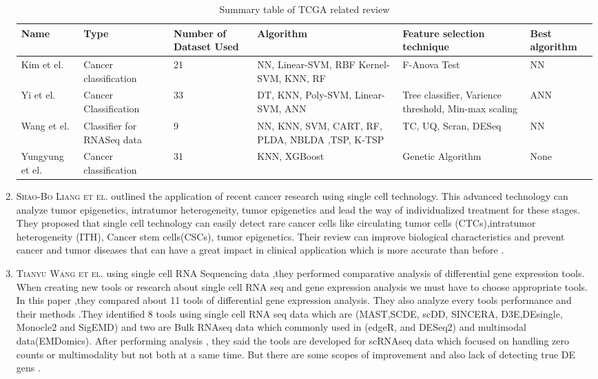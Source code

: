 \begin{enumerate}
   \begin{table}[H]
    \centering
    \begin{tabular}{|| p{2.1cm} |p{2.1cm} |p{2.1cm} |p{1.5cm}|p{2.1cm} | p{2.1cm}||}
    \hline\hline
     Name & Type & Number of Dataset Used & Algorithm & Feature selection technique & Best algorithm \\
     \hline
     Kim et el. \cite{10.1093/bioinformatics/btz772} & Cancer classification & 21 & NN, Linear-SVM, RBF Kernel- SVM, KNN, RF & F-Anova Test & NN  \\
      \hline
      Yi et el. \cite{pmid30441551} & Cancer Classification & 33 & DT,  KNN,  Poly-SVM, Linear-SVM, ANN &Tree classifier, Varience threshold, Min-max scaling & ANN  \\ 
     \hline
     Wang et el. \cite{10.1093/bioinformatics/btz801} & Classifier for RNASeq data
 & 9 & NN, KNN, SVM, CART, RF, PLDA, NBLDA ,TSP, K-TSP & TC, UQ, Scran, DESeq & NN \\
     \hline
    
     
     Yungyung et el. \cite{pmid28673244} & Cancer classification & 31 & KNN, XGBoost & Genetic Algorithm & None \\
     \hline
    
     
     
    \end{tabular}
    \caption{Summary table of TCGA related review}
    \label{table:1}
    \end{table}


  \item \textsc{Shao-Bo Liang et el.} outlined the application of recent cancer research using single cell technology.  This advanced technology can analyze tumor epigenetics, intratumor heterogeneity, tumor epigenetics and lead the way of individualized treatment for these stages. They proposed that single cell technology can easily detect rare cancer cells like circulating tumor cells (CTCs),intratumor heterogeneity (ITH), Cancer stem cells(CSCs), tumor epigenetics. Their review can improve biological characteristics and prevent  cancer and tumor diseases that can have a great impact in clinical application which is more accurate than before \cite{pmid10.1016}.
  
  \item \textsc{Tianyu Wang et el.} using single cell RNA Sequencing data ,they performed comparative analysis of differential gene expression tools. When creating new tools or research about single cell RNA seq and gene expression analysis we must have to choose appropriate tools. In this paper ,they compared about 11 tools of differential gene expression analysis. They also analyze every tools performance and their methods .They identified 8 tools using single cell RNA seq data which are (MAST,SCDE, scDD, SINCERA, D3E,DEsingle, Monocle2 and SigEMD) and two are Bulk RNAseq data which commonly used in (edgeR, and DESeq2) and multimodal data(EMDomics). After performing analysis , they said the tools are developed for scRNAseq data which focused on handling zero counts or multimodality but not both at a same time. But there are some scopes of improvement and also lack of detecting true DE gens \cite{Wang2019}.
  

\end{enumerate}
